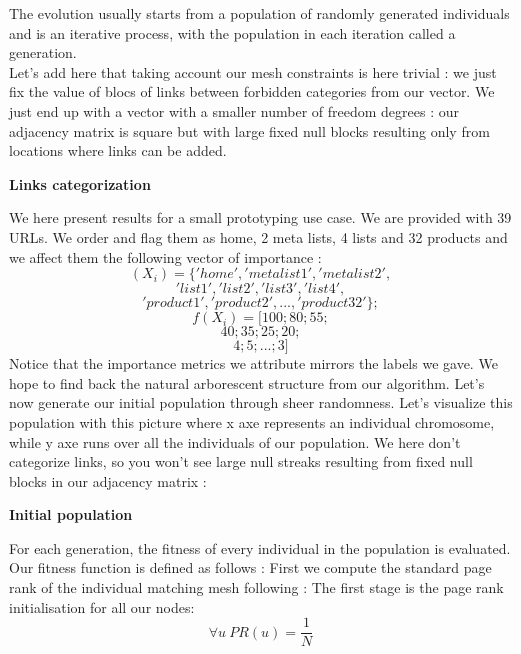 \documentclass{iSWAGArticle}
\begin{document}
The evolution usually starts from a population of randomly generated individuals and is an iterative process, with the population in each iteration called a generation.
\\\newline
Let's add here that taking account our mesh constraints is here trivial : we just fix the value of blocs of links between forbidden categories from our
vector. We just end up with a vector with a smaller number of freedom degrees : our adjacency matrix is square but with large fixed null blocks resulting only from locations where links can be added.
\begin{center}
\textbf{\large Links categorization}
\end{center}
\begin{center}
\end{center}
We here present results for a small prototyping use case.
We are provided with 39 URLs. We order and flag them as home, 2 meta lists, 4 lists and 32 products and we affect them
the following vector of importance :
$$
\left(X_i\right)=\{'home','metalist1','metalist2',
$$
$$
'list1','list2','list3','list4',
$$
$$
'product1','product2',...,'product32'\};
$$
$$
f\left(X_i\right) = [100;80;55;$$
$$
40;35;25;20;
$$
$$
4;5;...;3]
$$
Notice that the importance metrics we attribute mirrors the labels we gave. We hope to find back the natural arborescent structure from our algorithm.
Let's now generate our initial population through sheer randomness. Let's visualize this population with this picture where x axe represents an individual chromosome, 
while y axe runs over all the individuals of our population. We here don't categorize links, so you won't see large null streaks resulting from fixed null blocks in our adjacency matrix :
\\\newline
\begin{center}
\textbf{\large Initial population}
\end{center}
\begin{center}
\end{center}
For each generation, the fitness of every individual in the population is evaluated. Our fitness function is defined as follows :
First we compute the standard page rank of the individual matching mesh following \cite{page_rank} :
The first stage is the page rank initialisation for all our nodes:
\begin{equation}
\forall u \ PR\left(u\right)=\frac{1}{N}
\end{equation} 
\end{document}
